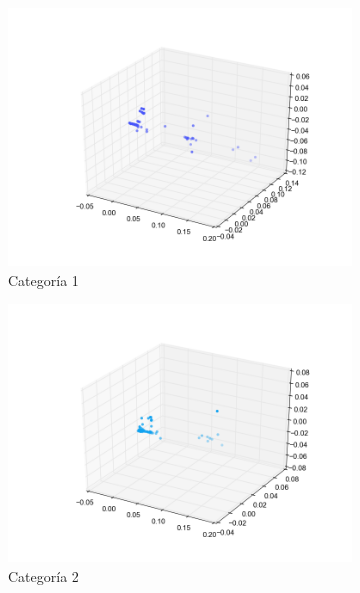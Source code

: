 \begin{figure}[H]
        \begin{subfigure}[b]{0.33\textwidth}
                \includegraphics[width=\linewidth]{secciones/graficos/oja/categoria_1.png}
                \caption{Categoría 1}
                \label{fig: ej1_oja_categoria_1}
        \end{subfigure}
        \begin{subfigure}[b]{0.33\textwidth}
                \includegraphics[width=\linewidth]{secciones/graficos/oja/categoria_2.png}
                \caption{Categoría 2}
                \label{fig: ej1_oja_categoria_2}
        \end{subfigure}
        \begin{subfigure}[b]{0.33\textwidth}

\end{subfigure}
\end{figure}
